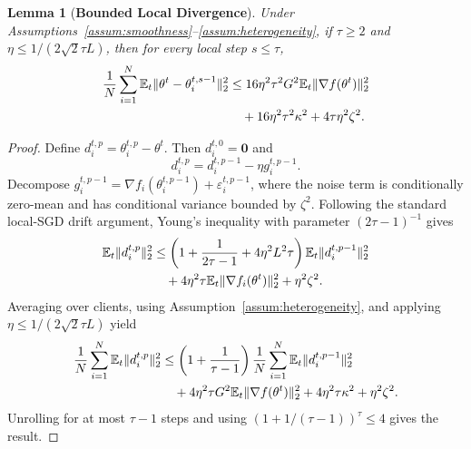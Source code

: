 \documentclass[conference]{IEEEtran}
\newtheorem{lemma}{Lemma}
\begin{document}
\begin{lemma}[\bf Bounded Local Divergence]
    \label{lemma:local_div}
    Under Assumptions~\ref{assum:smoothness}--\ref{assum:heterogeneity}, if $\tau\ge2$ and $\eta\le 1/(2\sqrt{2}\tau L)$, then for every local step $s\le\tau$,
    \begin{align}
        \frac1N\sum_{i=1}^{N}\mathbb{E}_t\|\theta^t-\theta_i^{t,s-1}\|_2^2
        &\le
        16\eta^2\tau^2G^2\mathbb{E}_t\|\nabla f(\theta^t)\|_2^2
        \notag\\
        &\quad+16\eta^2\tau^2\kappa^2+4\tau\eta^2\zeta^2.
    \end{align}
\end{lemma}
\begin{proof}
    Define $d_i^{t,p}=\theta_i^{t,p}-\theta^t$. Then $d_i^{t,0}=\mathbf{0}$ and
    \begin{equation}
        d_i^{t,p}=d_i^{t,p-1}-\eta g_i^{t,p-1}.
    \end{equation}
    Decompose $g_i^{t,p-1}=\nabla f_i(\theta_i^{t,p-1})+\varepsilon_i^{t,p-1}$, where the noise term is conditionally zero-mean and has conditional variance bounded by $\zeta^2$. Following the standard local-SGD drift argument, Young's inequality with parameter $(2\tau-1)^{-1}$ gives
    \begin{align}
        \mathbb{E}_t\|d_i^{t,p}\|_2^2
        &\le
        \left(1+\frac{1}{2\tau-1}+4\eta^2L^2\tau\right)
        \mathbb{E}_t\|d_i^{t,p-1}\|_2^2
        \notag\\
        &\quad+4\eta^2\tau\mathbb{E}_t\|\nabla f_i(\theta^t)\|_2^2+\eta^2\zeta^2.
    \end{align}
    Averaging over clients, using Assumption~\ref{assum:heterogeneity}, and applying $\eta\le 1/(2\sqrt{2}\tau L)$ yield
    \begin{align}
        \frac1N\sum_{i=1}^{N}\mathbb{E}_t\|d_i^{t,p}\|_2^2
        &\le
        \left(1+\frac{1}{\tau-1}\right)
        \frac1N\sum_{i=1}^{N}\mathbb{E}_t\|d_i^{t,p-1}\|_2^2
        \notag\\
        &\quad+4\eta^2\tau G^2\mathbb{E}_t\|\nabla f(\theta^t)\|_2^2
        +4\eta^2\tau\kappa^2+\eta^2\zeta^2.
    \end{align}
    Unrolling for at most $\tau-1$ steps and using $(1+1/(\tau-1))^{\tau}\le4$ gives the result.
\end{proof}
\end{document}
